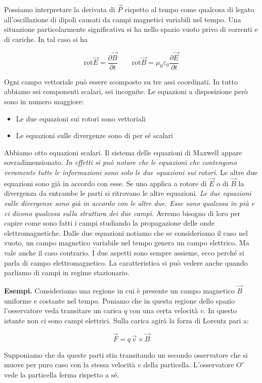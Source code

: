 Possiamo interpretare la derivata di $\vec{P}$ rispetto al tempo come qualcosa di legato all'oscillazione di dipoli causati da campi magnetici variabili nel tempo. Una situazione particolarmente significativa si ha nello spazio vuoto privo di correnti e di cariche. In tal caso si ha

\[
	\text{rot}\vec{E} = \frac{\partial \vec{B}}{\partial t} \qquad \text{rot}\vec{B} = \mu_0 \varepsilon_0 \frac{\partial \vec{E}}{\partial t}
\]

Ogni campo vettoriale può essere scomposto su tre assi coordinati. In tutto abbiamo sei componenti scalari, sei incognite. Le equazioni a disposizione però sono in numero maggiore:

\begin{itemize}
	\item Le due equazioni sui rotori sono vettoriali
	\item Le equazioni sulle divergenze sono di per sé scalari
\end{itemize}

Abbiamo otto equazioni scalari. Il sistema delle equazioni di Maxwell appare sovradimensionato. \emph{In effetti si può notare che le equazioni che contengono veramente tutte le informazioni sono solo le due equazioni sui rotori}. Le altre due equazioni sono già in accordo con esse. Se uno applica a rotore di $\vec{E}$ o di $\vec{B}$ la divergenza da entrambe le parti si ritrovano le altre equazioni.
\emph{Le due equazioni sulle divergenze sono già in accordo con le altre due. Esse sono qualcosa in più e ci dicono qualcosa sulla struttura dei due campi.} Avremo bisogno di loro per capire come sono fatti i campi studiando la propagazione delle onde elettromagnetiche.
Dalle due equazioni notiamo che se consideriamo il caso nel vuoto, un campo magnetico variabile nel tempo genera un campo elettrico. Ma vale anche il caso contrario. I due aspetti sono sempre assieme, ecco perché si parla di campo elettromagnetico. La caratteristica si può vedere anche quando parliamo di campi in regime stazionario.

\textbf{Esempi.}
Consideriamo una regione in cui è presente un campo magnetico $\vec{B}$ uniforme e costante nel tempo. Poniamo che in questa regione dello spazio l'osservatore veda transitare un carica $q$ con una certa velocità $v$. In questo istante non ci sono campi elettrici. Sulla carica agirà la forza di Lorentz pari a:

\[
	\vec{F} = q\,\vec{v} \times \vec{B}
\]

Supponiamo che da queste parti stia transitando un secondo osservatore che si muove per puro caso con la stessa velocità $v$ della particella. L'osservatore $O'$ vede la particella ferma rispetto a sé.

